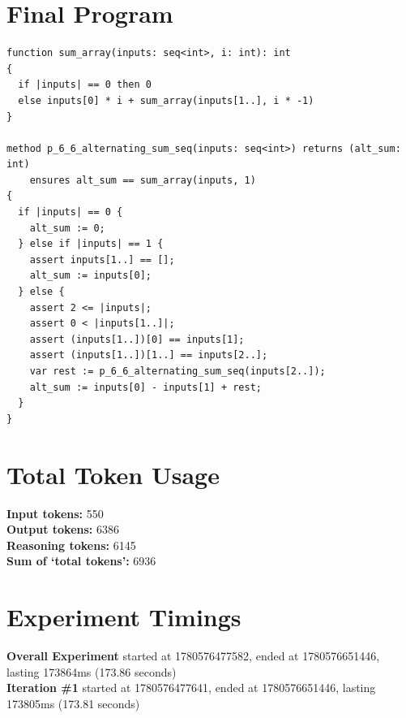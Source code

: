 \documentclass{article}
\begin{document}
\section*{Final Program}
\begin{lstlisting}
function sum_array(inputs: seq<int>, i: int): int
{
  if |inputs| == 0 then 0
  else inputs[0] * i + sum_array(inputs[1..], i * -1)
}

method p_6_6_alternating_sum_seq(inputs: seq<int>) returns (alt_sum: int)
	ensures alt_sum == sum_array(inputs, 1)
{
  if |inputs| == 0 {
    alt_sum := 0;
  } else if |inputs| == 1 {
    assert inputs[1..] == [];
    alt_sum := inputs[0];
  } else {
    assert 2 <= |inputs|;
    assert 0 < |inputs[1..]|;
    assert (inputs[1..])[0] == inputs[1];
    assert (inputs[1..])[1..] == inputs[2..];
    var rest := p_6_6_alternating_sum_seq(inputs[2..]);
    alt_sum := inputs[0] - inputs[1] + rest;
  }
}
\end{lstlisting}
\section*{Total Token Usage}
\textbf{Input tokens: }550
\\\textbf{Output tokens: }6386
\\\textbf{Reasoning tokens: }6145
\\\textbf{Sum of `total tokens': }6936
\section*{Experiment Timings}
\textbf{Overall Experiment} started at 1780576477582, ended at 1780576651446, lasting 173864ms (173.86 seconds)
\\\textbf{Iteration \#1} started at 1780576477641, ended at 1780576651446, lasting 173805ms (173.81 seconds)
\end{document}
